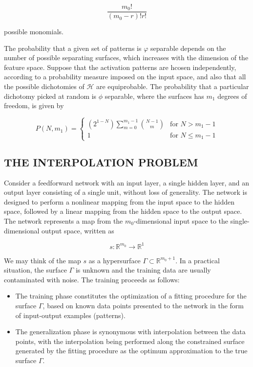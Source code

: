 \documentclass{article}
\begin{document}
$$ \dfrac{m_{0}!}{ (m_{0} - r)! r!} $$

\noindent possible monomials.

The probability that a given set of patterns is $ \varphi $ separable depends on the number of possible separating surfaces, which increases with the dimension of the feature space. Suppose that the activation patterns are hcosen independently, according to a probability measure imposed on the input space, and also that all the possible dichotomies of $ \mathcal{H} $ are equiprobable. The probability that a particular dichotomy picked at random is $ \phi $ separable, where the surfaces has $ m_{1} $ degrees of freedom, is given by

\[
	P (N, m_{1}) = \begin{cases}
		(2^{1 - N}) \displaystyle\sum_{m = 0}^{m_{1} - 1} \binom{N - 1}{m} & \text{for } N > m_{1} - 1 \\
		1 & \text{for } N \leq m_{1} - 1
	\end{cases}
\]

\subsection{THE INTERPOLATION PROBLEM}

Consider a feedforward network with an input layer, a single hidden layer, and an output layer consisting of a single unit, without loss of generality. The network is designed to perform a nonlinear mapping from the input space to the hidden space, followed by a linear mapping from the hidden space to the output space. The network represents a map from the $ m_{0} $-dimensional input space to the single-dimensional output space, written as

$$ s: \mathbb{R}^{m_{0}} \rightarrow \mathbb{R}^{1} $$

We may think of the map $ s $ as a hypersurface $ \Gamma \subset \mathbb{R}^{m_{0} + 1} $. In a practical situation, the surface $ \Gamma $ is unknown and the training data are usually contaminated with noise. The training proceeds as follows:

\begin{itemize}
	\item The training phase constitutes the optimization of a fitting procedure for the surface $ \Gamma $, based on known data points presented to the network in the form of input-output examples (patterns).
	\item The generalization phase is synonymous with interpolation between the data points, with the interpolation being performed along the constrained surface generated by the fitting procedure as the optimum approximation to the true surface $ \Gamma $.
\end{itemize}
\end{document}
